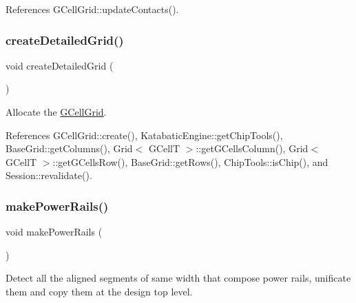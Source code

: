 References G\+Cell\+Grid\+::update\+Contacts().

\mbox{\label{classKatabatic_1_1KatabaticEngine_a1b7d8ed09a198f7afd6e3ac911f6eb37}} 
\subsubsection{\texorpdfstring{create\+Detailed\+Grid()}{createDetailedGrid()}}
{\footnotesize\ttfamily void create\+Detailed\+Grid (\begin{DoxyParamCaption}{ }\end{DoxyParamCaption})\hspace{0.3cm}{\ttfamily [virtual]}}

Allocate the \mbox{\hyperlink{classKatabatic_1_1GCellGrid}{G\+Cell\+Grid}}. 

References G\+Cell\+Grid\+::create(), Katabatic\+Engine\+::get\+Chip\+Tools(), Base\+Grid\+::get\+Columns(), Grid$<$ G\+Cell\+T $>$\+::get\+G\+Cells\+Column(), Grid$<$ G\+Cell\+T $>$\+::get\+G\+Cells\+Row(), Base\+Grid\+::get\+Rows(), Chip\+Tools\+::is\+Chip(), and Session\+::revalidate().

\mbox{\label{classKatabatic_1_1KatabaticEngine_aaba3b9450c85634131146fb507089f2d}} 
\subsubsection{\texorpdfstring{make\+Power\+Rails()}{makePowerRails()}}
{\footnotesize\ttfamily void make\+Power\+Rails (\begin{DoxyParamCaption}{ }\end{DoxyParamCaption})}

Detect all the aligned segments of same width that compose power rails, unificate them and copy them at the design top level. \mbox{\label{classKatabatic_1_1KatabaticEngine_a583925cfe4bbadcc1c24fe619debce09}} 
